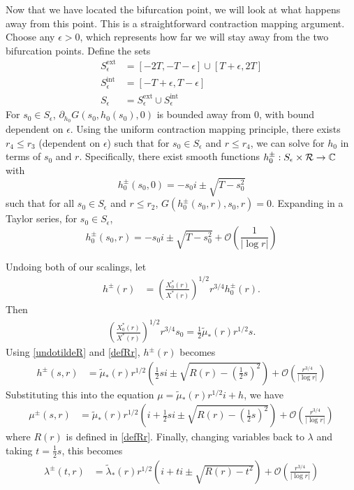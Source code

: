 \documentclass[thesis.tex]{subfiles}
\begin{document}
Now that we have located the bifurcation point, we will look at what happens away from this point. This is a straightforward contraction mapping argument. Choose any $\epsilon > 0$, which represents how far we will stay away from the two bifurcation points. Define the sets
\begin{align*}
S_\epsilon^{\text{ext}} &= \left[-2 T, -T - \epsilon\right] \cup \left[T + \epsilon, 2T\right] \\
S_\epsilon^{\text{int}} &= 
\left[-T + \epsilon, T - \epsilon\right] \\
S_\epsilon &= S_\epsilon^{\text{ext}} \cup S_\epsilon^{\text{int}}
\end{align*}
For $s_0 \in S_\epsilon$, $\partial_{h_0} G(s_0, h_0(s_0), 0)$ is bounded away from 0, with bound dependent on $\epsilon$. Using the uniform contraction mapping principle, there exists $r_4 \leq r_3$ (dependent on $\epsilon$) such that for $s_0 \in S_\epsilon$ and $r \leq r_4$, we can solve for $h_0$ in terms of $s_0$ and $r$. Specifically, there exist smooth functions $h_0^\pm: S_\epsilon \times \mathcal{R} \rightarrow \mathbb{C}$ with
\[
h_0^\pm(s_0, 0) = -s_0 i \pm \sqrt{ T - s_0^2 }
\]
such that for all $s_0 \in S_\epsilon$ and $r \leq r_2$, $G(h_0^\pm(s_0,r),s_0,r) = 0$. Expanding in a Taylor series, for $s_0 \in S_\epsilon$,
\[
h_0^\pm(s_0, r) = -s_0 i \pm \sqrt{ T - s_0^2 } + \mathcal{O}\left( \frac{1}{|\log r|} \right)
\]

Undoing both of our scalings, let
\begin{align*}
h^\pm(r) &= \left(\frac{X_0^*(r)}{X^*(r) }\right)^{1/2} r^{3/4} h_0^\pm(r).
\end{align*}
Then
\begin{align*}
\left(\frac{X_0^*(r)}{X^*(r) }\right)^{1/2} r^{3/4} s_0 = \frac{1}{2} \tilde{\mu}_*(r) r^{1/2} s.
\end{align*}
Using \cref{undotildeR} and \cref{defRr}, $h^\pm(r)$ becomes
\begin{align*}
h^\pm(s, r) &= \tilde{\mu}_*(r) r^{1/2} \left( \frac{1}{2}  s i \pm \sqrt{ R(r) - \left(\frac{1}{2} s\right)^2 } \right) + \mathcal{O}\left(\frac{r^{3/4}}{|\log r|} \right)
\end{align*}
Substituting this into the equation $\mu = \tilde{\mu}_*(r) r^{1/2} i + h$, we have
\begin{align*}
\mu^\pm(s, r) &= \tilde{\mu}_*(r) r^{1/2} \left( i + \frac{1}{2}  s i \pm \sqrt{ R(r) - \left(\frac{1}{2} s\right)^2 } \right) + \mathcal{O}\left(\frac{r^{3/4}}{|\log r|} \right)
\end{align*}
where $R(r)$ is defined in \cref{defRr}. Finally, changing variables back to $\lambda$ and taking $t = \frac{1}{2}s$, this becomes
\begin{align}\label{lambdabubble}
\lambda^\pm(t, r) &= \tilde{\lambda}_*(r) r^{1/2} \left( i + t i \pm \sqrt{ R(r) - t^2 } \right) + \mathcal{O}\left(\frac{r^{3/4}}{|\log r|} \right)
\end{align}
\end{document}
